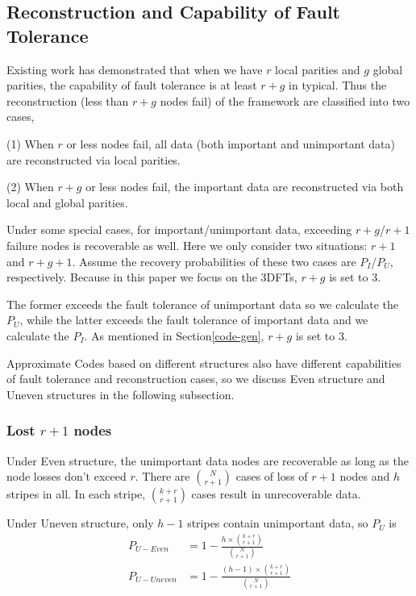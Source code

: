 \documentclass[sigconf]{acmart}
\begin{document}
\subsection{Reconstruction and Capability of Fault Tolerance}\label{ReconstructionFT}

Existing work \cite{LRC} has demonstrated that when we have $r$ local parities and $g$ global parities, the capability of fault tolerance is at least $r+g$ in typical. Thus the reconstruction (less than $r+g$ nodes fail) of the framework are classified into two cases,

(1) When $r$ or less nodes fail, all data (both important and unimportant data) are reconstructed via local parities.

(2) When $r+g$ or less nodes fail, the important data are reconstructed via both local and global parities.

Under some special cases, for important/unimportant data, exceeding $r+g$/$r+1$ failure nodes is recoverable as well. 
Here we only consider two situations: $r+1$ and $r+g+1$. Assume the recovery probabilities of these two cases are $P_{I}$/$P_{U}$, respectively. Because in this paper we focus on the 3DFTs, $r+g$ is set to 3.

The former exceeds the fault tolerance of unimportant data so we calculate the $P_{U}$, while the latter exceeds the fault tolerance of important data and we calculate the $P_{I}$.
As mentioned in Section\ref{code-gen}, $r+g$ is set to 3.

Approximate Codes based on different structures also have different capabilities of fault tolerance and reconstruction cases, so we discuss Even structure and Uneven structures in the following subsection.

\subsubsection{Lost $r+1$ nodes}
Under Even structure, the unimportant data nodes are recoverable as long as the node losses don't exceed $r$.
There are $\binom{N}{r+1}$ cases of loss of $r+1$ nodes and $h$ stripes in all. In each stripe, $\binom{k+r}{r+1}$ cases result in unrecoverable data.

Under Uneven structure, only $h-1$ stripes contain unimportant data, so $P_{U}$ is
\begin{align}
    P_{U-Even} &= 1 - \frac{h \times \binom{k+r}{r+1}}{\binom{N}{r+1}}\\
    P_{U-Uneven} &= 1 - \frac{(h-1) \times \binom{k+r}{r+1}}{\binom{N}{r+1}}
\end{align}
\end{document}
